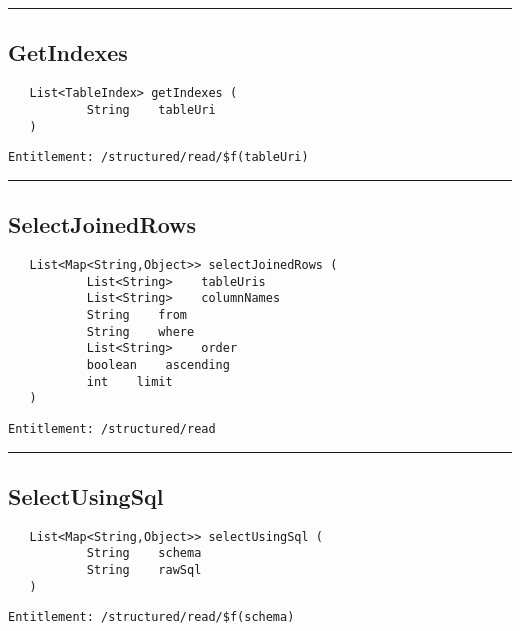 \rule{12cm}{2pt}
\subsection{GetIndexes}
\label{Api:GetIndexes}
\begin{Verbatim}
   List<TableIndex> getIndexes (
           String    tableUri
   )
\end{Verbatim}
\begin{Verbatim}[formatcom=\color{Maroon}]
  Entitlement: /structured/read/$f(tableUri)
\end{Verbatim}



\rule{12cm}{2pt}
\subsection{SelectJoinedRows}
\label{Api:SelectJoinedRows}
\begin{Verbatim}
   List<Map<String,Object>> selectJoinedRows (
           List<String>    tableUris
           List<String>    columnNames
           String    from
           String    where
           List<String>    order
           boolean    ascending
           int    limit
   )
\end{Verbatim}
\begin{Verbatim}[formatcom=\color{Maroon}]
  Entitlement: /structured/read
\end{Verbatim}



\rule{12cm}{2pt}
\subsection{SelectUsingSql}
\label{Api:SelectUsingSql}
\begin{Verbatim}
   List<Map<String,Object>> selectUsingSql (
           String    schema
           String    rawSql
   )
\end{Verbatim}
\begin{Verbatim}[formatcom=\color{Maroon}]
  Entitlement: /structured/read/$f(schema)
\end{Verbatim}



